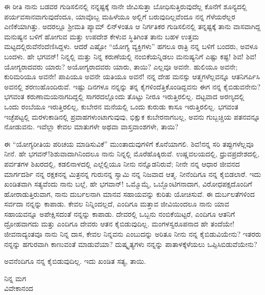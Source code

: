 ಈ ರೀತಿ ನಾನು ಬಡವರ ಗುಡಿಸಲಿನಲ್ಲಿ ನನ್ನಷ್ಟಕ್ಕೆ ನಾನೇ ಜೀವಿಸುತ್ತಾ ಬೋಧಿಸುತ್ತಿರುವುದೆಲ್ಲ ಕೊನೆಗೆ ಶೂನ್ಯದಲ್ಲಿ ಪರ್ಯವಸಾನವಾಗುವುದೆಂದೂ, ಯಾವೊಬ್ಬ ಮಹಿಳೆಯೂ ಅಲ್ಲಿಗೆ ಬರುವುದಿಲ್ಲವೆಂದೂ ನನ್ನ ಗೆಳೆಯರೆಲ್ಲರ ಎಣಿಕೆಯಾಗಿತ್ತು. ಅದರಲ್ಲೂ ಶ‍್ರೀಮತಿ ಪ್ಯಾಮ್ ಲಿನ್‌ಳಂತೂ ಆ ನಿರ್ಗತಿಕರ ಗುಡಿಸಲಿನಲ್ಲಿ ತನ್ನಷ್ಟಕ್ಕೆ ತಾನು ವಾಸವಾಗಿದ್ದ ಮನುಷ್ಯನ ಬಳಿಗೆ ಹೋಗುವ ಮತ್ತು ಉಪದೇಶ ಕೇಳುವ ಸ್ಥಿತಿಗಿಂತ ತಾನು ಬಹಳ ಉತ್ತಮ ಮಟ್ಟದಲ್ಲಿರುವೆನೆಂದೆಣಿಸಿದ್ದಳು. ಆದರೆ ಎಷ್ಟೋ “ಯೋಗ್ಯ ವ್ಯಕ್ತಿಗಳು” ಹಗಲೂ ರಾತ್ರಿ ನನ್ನ ಬಳಿಗೆ ಬಂದರು, ಅವಳೂ ಬಂದಳು. ಹೇ ಭಗವನ್! ನಿನ್ನಲ್ಲಿ ಮತ್ತು ನಿನ್ನ ಕರುಣೆಯಲ್ಲಿ ನಂಬಿಕೆಯನ್ನಿಡಲು ಮನುಷ್ಯನಿಗೆ ಎಷ್ಟು ಕಷ್ಟ! ಶಿವ! ಶಿವ! ಯೋಗ್ಯರಾದವರು ಯಾರು? ಅಯೋಗ್ಯರಾದವರು ಯಾರು, ತಾಯಿ? ಎಲ್ಲವೂ ಅವನೇ. ಹುಲಿಯೂ ಅವನೇ; ಕುರಿಮರಿಯೂ ಅವನೇ! ಪಾಪಿಯೂ ಅವನೇ ಯತಿಯೂ ಅವನೆ! ನನ್ನ ದೇಹ ಮನಸ್ಸು ಆತ್ಮಗಳೆಲ್ಲವನ್ನೂ ಆತನಿಗರ್ಪಿಸಿ ಅವನಲ್ಲಿ ಶರಣುಹೊಂದಿರುವೆ. ಇಷ್ಟು ದಿನಗಳೂ ನನ್ನನ್ನು ತನ್ನ ಕೈಗಳಿಂದೆತ್ತಿಕೊಂಡಿದ್ದವನು ಈಗ ನನ್ನ ಕೈಬಿಡುವನೇನು? ಭಗವಂತ ಕರುಣಾಮಯನಾಗದಿದ್ದಲ್ಲಿ ಸಾಗರದಲ್ಲೊಂದು ತೊಟ್ಟು ನೀರೂ ಇರುತ್ತಿರಲಿಲ್ಲ. ದಟ್ಟವಾದ ಅರಣ್ಯದಲ್ಲಿ ಒಂದು ರಂಬೆಯೂ ಇರುತ್ತಿರಲಿಲ್ಲ, ಕುಬೇರನ ಮನೆಯಲ್ಲಿ ಒಂದು ಕುರುಡು ಕಾಸೂ ಇರುತ್ತಿರಲಿಲ್ಲ. ಭಗವಂತ ಇಚ್ಛೆಪಟ್ಟಲ್ಲಿ ಮರಳುಕಾಡಿನಲ್ಲಿ ಪ್ರವಾಹಗಳುಂಟಾಗುವುವು, ಭಿಕ್ಷುಕ ಕುಬೇರನಾಗಬಲ್ಲ, 
ಅವನು ಗುಬ್ಬಚ್ಚಿಯ ಪತನವನ್ನೂ ನೋಡುವನು. ಇವೆಲ್ಲಾ ಕೇವಲ ಮಾತುಗಳೇ ಅಥವಾ ವಾಸ್ತವಾಂಶಗಳೇ, ತಾಯಿ?

\vspace{0.15cm}

ಈ “ಯೋಗ್ಯರೀತಿಯ ಪರಿಚಯ ಮಾಡಿಸುವಿಕೆ” ಮುಂತಾದುವುಗಳಿಗೆ ಕೊನೆಯಾ\-ಗಲಿ. ಶಿವ!ನನ್ನ ಸರಿ ತಪ್ಪುಗಳೆಲ್ಲವೂ ನೀನೆ. ಹೇ ಭಗವನ್!ಶಿಶುವಾದಾಗಿನಿಂದಲೂ ನಾನು ನಿನ್ನಲ್ಲಿ ಮೊರೆಹೊಕ್ಕಿರುವೆ. ಉಷ್ಣವಲಯದಲ್ಲಿ, ಧ್ರುವಪ್ರದೇಶದಲ್ಲಿ, ಪರ್ವತಗಳ ಶಿಖರದಲ್ಲಿ, ಕಡಲಿನಾಳದಲ್ಲಿ ಎಲ್ಲೆಲ್ಲಿಯೂ ನೀನು ನನ್ನೊಡನಿರುವೆ; ನೀನೇ ನನ್ನ ಆಧಾರ\enginline{-} ಜೀವನದ\enginline{-} ಮಾರ್ಗದರ್ಶಿ\enginline{-} ನನ್ನ ರಕ್ಷಕ\enginline{-}ನನ್ನ ಮಿತ್ರ\enginline{-}ನನ್ನ ಗುರು\enginline{-}ನನ್ನ ಸ್ವಾಮಿ\enginline{-} ನನ್ನ ನಿಜವಾದ ಆತ್ಮ. ನೀನೆಂದಿಗೂ ನನ್ನ ಕೈಬಿಡಲಾರೆ. ಇದು ಖಂಡಿತವಾಗಿ ಸತ್ಯವೆಂದು ನಾನು ಬಲ್ಲೆ, ಹೇ ಭಗವಾನ್! ಒಮ್ಮೊಮ್ಮೆ, ಒಬ್ಬೊಂಟಿಗನಾದಾಗ, ವಿರೋಧಪಕ್ಷದೊಂದಿಗೆ ಹೋರಾಡುತ್ತಿರುವಾಗ, ನಾನು ದುರ್ಬಲನಾಗಿ ಮಾನವ ಸಹಾಯವನ್ನು ಕುರಿತು ಯೋಚಿಸುವೆ. ಈ ದುರ್ಬಲತೆಗಳಿಂದ ಸರ್ವದಾ ನನ್ನನ್ನು ಕಾಪಾಡು. ಕೇವಲ ನಿನ್ನಿಂದಲ್ಲದೆ, ಎಂದಿಗೂ ಮತ್ತಾವ ಜೀವಿಯಿಂದಲೂ ನಾನು ಯಾವ ಸಹಾಯವನ್ನೂ ಅಪೇಕ್ಷಿಸದಂತೆ ನನ್ನನ್ನು ಕಾಪಾಡು. ದೇವರಲ್ಲಿ ಒಬ್ಬನು ನಂಬಿಕೆಯಿಟ್ಟರೆ, ಎಂದಿಗೂ ಆತನಿಗೆ ದ್ರೋಹವಾಗದು ಮತ್ತು ಎಂದಿಗೂ ದೇವರು ಆತನ ಕೈಬಿಡುವುದಿಲ್ಲ. ಮಂಗಳಸ್ವರೂಪನಾದ ಹೇ ತಂದೆಯೇ! ಜೀವನಾದ್ಯಂತವೂ ನಾನು ನಿನ್ನ ದಾಸ, ಕೇವಲ ನಿನ್ನವನು ಎಂಬುದನ್ನು ಅರಿತೂ ನೀನು ನನ್ನ ಕೈಬಿಡುವಿಯೇನು? ಇತರರು ನನ್ನನ್ನು ಹಗುರವಾಗಿ ಕಾಣುವಂತೆ ಮಾಡುವೆಯಾ? ದುಷ್ಕೃತ್ಯಗಳು ನನ್ನನ್ನು ಪಾತಾಳಕ್ಕೆಳೆಯಲು ಒಪ್ಪಿಸಿಬಿಡುವೆಯೇನು?

\vspace{0.15cm}

ಅವನೆಂದಿಗೂ ನನ್ನ ಕೈಬಿಡುವುದಿಲ್ಲ. ಇದು ಖಂಡಿತ ಸತ್ಯ, ತಾಯಿ.

{\flushright
ನಿನ್ನ ಮಗ\\ವಿವೇಕಾನಂದ\par}

